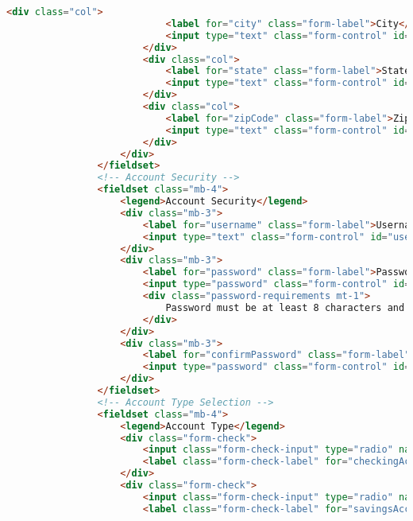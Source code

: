 \begin{lstlisting}[language=HTML]
                        <div class="col">
                            <label for="city" class="form-label">City</label>
                            <input type="text" class="form-control" id="city" required>
                        </div>
                        <div class="col">
                            <label for="state" class="form-label">State</label>
                            <input type="text" class="form-control" id="state" required>
                        </div>
                        <div class="col">
                            <label for="zipCode" class="form-label">Zip Code</label>
                            <input type="text" class="form-control" id="zipCode" required>
                        </div>
                    </div>
                </fieldset>
                <!-- Account Security -->
                <fieldset class="mb-4">
                    <legend>Account Security</legend>
                    <div class="mb-3">
                        <label for="username" class="form-label">Username</label>
                        <input type="text" class="form-control" id="username" required>
                    </div>
                    <div class="mb-3">
                        <label for="password" class="form-label">Password</label>
                        <input type="password" class="form-control" id="password" required>
                        <div class="password-requirements mt-1">
                            Password must be at least 8 characters and include uppercase, lowercase, number, and special character.
                        </div>
                    </div>
                    <div class="mb-3">
                        <label for="confirmPassword" class="form-label">Confirm Password</label>
                        <input type="password" class="form-control" id="confirmPassword" required>
                    </div>
                </fieldset>
                <!-- Account Type Selection -->
                <fieldset class="mb-4">
                    <legend>Account Type</legend>
                    <div class="form-check">
                        <input class="form-check-input" type="radio" name="accountType" id="checkingAccount" value="checking" checked>
                        <label class="form-check-label" for="checkingAccount">Checking Account</label>
                    </div>
                    <div class="form-check">
                        <input class="form-check-input" type="radio" name="accountType" id="savingsAccount" value="savings">
                        <label class="form-check-label" for="savingsAccount">Savings Account</label>

\end{lstlisting}
